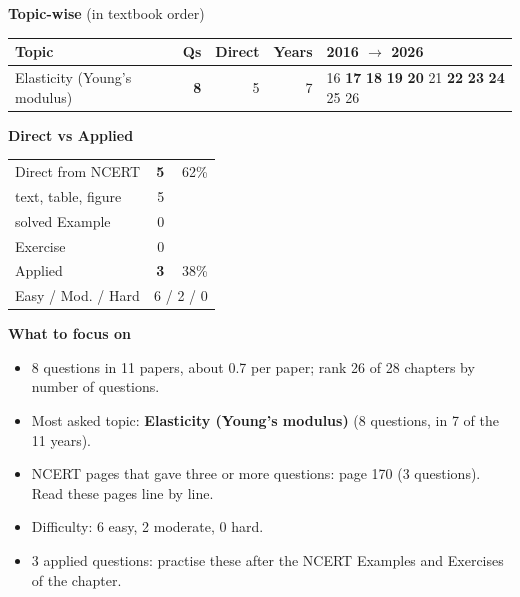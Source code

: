 {\small\textbf{\color{crimson}Topic-wise} (in textbook order)\par\smallskip
\begin{tabularx}{\linewidth}{@{}>{\raggedright\arraybackslash}Xrrrl@{}}\toprule
Topic & Qs & Direct & Years & 2016 $\rightarrow$ 2026\\\midrule
Elasticity (Young's modulus) & \textbf{8} & 5 & 7 & {\scriptsize {\color{gray!45}16} \textbf{17} \textbf{18} \textbf{19} \textbf{20} {\color{gray!45}21} \textbf{22} \textbf{23} \textbf{24} {\color{gray!45}25} {\color{gray!45}26}}\\
\bottomrule\end{tabularx}}\par\medskip
\begin{minipage}[t]{0.34\linewidth}{\small\textbf{\color{crimson}Direct vs Applied}\par\smallskip
\begin{tabular}{@{}lrr@{}}\toprule
Direct from NCERT & \textbf{5} & 62\%\\
\quad text, table, figure & 5 &\\
\quad solved Example & 0 &\\
\quad Exercise & 0 &\\
Applied & \textbf{3} & 38\%\\\midrule
Easy / Mod. / Hard & \multicolumn{2}{r}{6 / 2 / 0}\\\bottomrule
\end{tabular}}\end{minipage}\hfill
\begin{minipage}[t]{0.63\linewidth}{\small\textbf{\color{crimson}What to focus on}\par\smallskip
\begin{itemize}[leftmargin=1.1em,itemsep=1pt,topsep=0pt]
\item 8 questions in 11 papers, about 0.7 per paper; rank 26 of 28 chapters by number of questions.
\item Most asked topic: \textbf{Elasticity (Young's modulus)} (8 questions, in 7 of the 11 years).
\item NCERT pages that gave three or more questions: page 170 (3 questions). Read these pages line by line.
\item Difficulty: 6 easy, 2 moderate, 0 hard.
\item 3 applied questions: practise these after the NCERT Examples and Exercises of the chapter.
\end{itemize}}\end{minipage}\par
